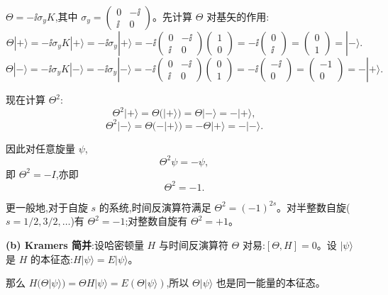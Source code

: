 \begin{question}
\begin{solution}
	$\Theta = -\ii\sigma_y K$,其中 $\sigma_y = \begin{pmatrix}0&-\ii\\\ii&0\end{pmatrix}$。先计算 $\Theta$ 对基矢的作用:
	\[
	\Theta|+\rangle = -\ii\sigma_y K|+\rangle = -\ii\sigma_y|+\rangle
	= -\ii\begin{pmatrix}0&-\ii\\\ii&0\end{pmatrix}\begin{pmatrix}1\\0\end{pmatrix}
	= -\ii\begin{pmatrix}0\\\ii\end{pmatrix} = \begin{pmatrix}0\\1\end{pmatrix} = |-\rangle.
	\]
	\[
	\Theta|-\rangle = -\ii\sigma_y K|-\rangle = -\ii\sigma_y|-\rangle
	= -\ii\begin{pmatrix}0&-\ii\\\ii&0\end{pmatrix}\begin{pmatrix}0\\1\end{pmatrix}
	= -\ii\begin{pmatrix}-\ii\\0\end{pmatrix} = \begin{pmatrix}-1\\0\end{pmatrix} = -|+\rangle.
	\]

	现在计算 $\Theta^2$:
	\[
	\Theta^2|+\rangle = \Theta(|+\rangle) = \Theta|-\rangle = -|+\rangle,
	\]
	\[
	\Theta^2|-\rangle = \Theta(-|+\rangle) = -\Theta|+\rangle = -|-\rangle.
	\]

	因此对任意旋量 $\psi$,
	\[
	\Theta^2\psi = -\psi,
	\]
	即 $\Theta^2 = -I$,亦即
	\[
	\boxed{\Theta^2 = -1}.
	\]

	更一般地,对于自旋 $s$ 的系统,时间反演算符满足 $\Theta^2 = (-1)^{2s}$。对半整数自旋($s=1/2,3/2,\ldots$)有 $\Theta^2=-1$;对整数自旋有 $\Theta^2=+1$。

		\textbf{(b) Kramers 简并}:设哈密顿量 $H$ 与时间反演算符 $\Theta$ 对易:$[\Theta,H]=0$。设 $|\psi\rangle$ 是 $H$ 的本征态:$H|\psi\rangle=E|\psi\rangle$。

		那么 $H(\Theta|\psi\rangle) = \Theta H|\psi\rangle = E(\Theta|\psi\rangle)$,所以 $\Theta|\psi\rangle$ 也是同一能量的本征态。


\end{solution}
\end{question}
